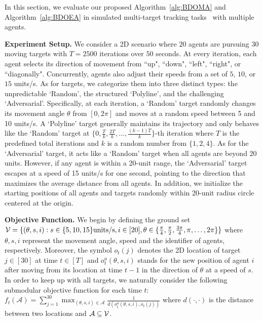 	In this section, we evaluate our proposed Algorithm~\ref{alg:BDOMA} and Algorithm~\ref{alg:BDOEA} in simulated multi-target tracking tasks~\citep{corah2021scalable,xu2023online} with multiple agents.
		
		\textbf{Experiment Setup.} We consider a 2D scenario where $20$ agents are pursuing $30$ moving targets with $T=2500$ iterations over $50$ seconds. At every iteration, each agent selects its direction of movement from ``up", ``down", ``left", ``right", or ``diagonally". Concurrently, agents also adjust their speeds from a set of $5$, $10$, or $15$ units/s. As for targets, we categorize them into three distinct types: the unpredictable `Random', the structured `Polyline', and the challenging `Adversarial'. Specifically, at each iteration, a `Random' target randomly changes its movement angle $\theta$ from $[0,2\pi]$ and moves at a random speed between 5 and 10 units/s. A `Polyline' target generally maintains its trajectory and only
	behaves like the `Random' target at $\{0, \frac{T}{k}, \frac{2T}{k},\dots, \frac{(k-1)T}{k}\}$-th iteration where $T$ is the predefined total iterations and $k$ is a random number from $\{1,2,4\}$. As for the `Adversarial' target, it acts like a `Random' target when all agents are beyond 20 units. However, if any agent is within a 20-unit range, the `Adversarial' target escapes at a speed of 15 units/s for one second, pointing to the direction that maximizes the average distance from all agents. In addition, we initialize the starting positions of all agents and targets randomly within 20-unit radius circle centered at the origin. 
	
	
	\textbf{Objective Function.} We begin by defining the ground set $\mathcal{V}=\{(\theta,s,i):s\in\{5,10,15\}\text{units/s},i\in[20],\theta\in\{\frac{\pi}{4},\frac{\pi}{2},\frac{3\pi}{4},\pi,\dots,2\pi\}\}$ where $\theta,s,i$ represent the movement angle, speed and the identifier of agents, respectively. Moreover, the symbol  $o_{t}(j)$ denotes the 2D location of target $j\in[30]$ at time $t\in[T]$ and $o^{a}_{t}(\theta,s,i)$ stands for the new position of agent $i$ after moving from its location at time $t-1$  in the direction of $\theta$ at a speed of $s$. In order to keep up with all targets, we naturally consider the following submodular objective function for each time $t$: $f_{t}(\mathcal{A})=\sum_{j=1}^{30}\max_{(\theta,s,i)\in\mathcal{A}}\frac{1}{d(o^{a}_{t}(\theta,s,i),o_{t}(j))}$ where $d(\cdot,\cdot)$ is the distance between two locations and $\mathcal{A}\subseteq\mathcal{V}$.
	
